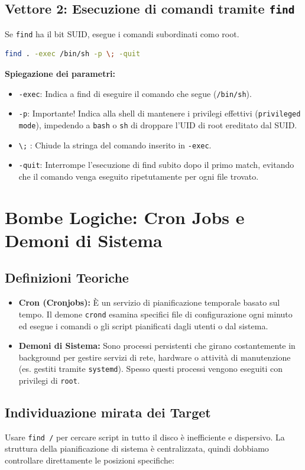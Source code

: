 \documentclass[12pt,a4paper]{report}
\begin{document}
	\subsection{Vettore 2: Esecuzione di comandi tramite \texttt{find}}
	Se \texttt{find} ha il bit SUID, esegue i comandi subordinati como root.
	\begin{lstlisting}[language=bash]
		find . -exec /bin/sh -p \; -quit
	\end{lstlisting}
	\textbf{Spiegazione dei parametri:}
	\begin{itemize}
		\item \texttt{-exec}: Indica a find di eseguire il comando che segue (\texttt{/bin/sh}).
		\item \texttt{-p}: Importante! Indica alla shell di mantenere i privilegi effettivi (\texttt{privileged mode}), impedendo a \texttt{bash} o \texttt{sh} di droppare l'UID di root ereditato dal SUID.
		\item \texttt{\textbackslash;} : Chiude la stringa del comando inserito in \texttt{-exec}.
		\item \texttt{-quit}: Interrompe l'esecuzione di find subito dopo il primo match, evitando che il comando venga eseguito ripetutamente per ogni file trovato.
	\end{itemize}
	
	\section{Bombe Logiche: Cron Jobs e Demoni di Sistema}
	
	\subsection{Definizioni Teoriche}
	\begin{itemize}
		\item \textbf{Cron (Cronjobs):} È un servizio di pianificazione temporale basato sul tempo. Il demone \texttt{crond} esamina specifici file di configurazione ogni minuto ed esegue i comandi o gli script pianificati dagli utenti o dal sistema.
		\item \textbf{Demoni di Sistema:} Sono processi persistenti che girano costantemente in background per gestire servizi di rete, hardware o attività di manutenzione (es. gestiti tramite \texttt{systemd}). Spesso questi processi vengono eseguiti con privilegi di \texttt{root}.
	\end{itemize}
	
	\subsection{Individuazione mirata dei Target}
	Usare \texttt{find /} per cercare script in tutto il disco è inefficiente e dispersivo. La struttura della pianificazione di sistema è centralizzata, quindi dobbiamo controllare direttamente le posizioni specifiche:
	
\end{document}
